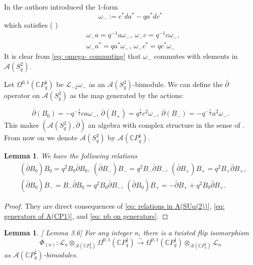 \documentclass[12pt]{article}
\newtheorem{lemma}[definition]{Lemma}
\numberwithin{equation}{section}
\def\pb{\bar{\partial}}
\def\C{{\mathbb C}}
\def\A{\mathcal{A}}
\def\L{\mathcal{L}}
\begin{document}
In \cite[Equation (3.18)]{khalkhali2011holomorphic} the authors introduced the $1$-form
$$
\omega_-:=c^* da^*-qa^*dc^*
$$
which satisfies ( \cite[Equation (3.21)]{khalkhali2011holomorphic})
\begin{equation}\label{eq: omega- commuting}
\begin{split}
&\omega_-a=q^{-1}a\omega_-,~\omega_-c=q^{-1}c\omega_-,\\
&\omega_-a^*=qa^*\omega_-,~ \omega_-c^*=qc^*\omega_-
\end{split}
\end{equation}
It is clear from \eqref{eq: omega- commuting} that $\omega_-$ commutes with elements in $\A(S_q^2)$.

Let $\Omega^{0,1}(\C P^1_q)$ be $\L_{-2}\omega_-$ as an $\A(S_q^2)$-bimodule. We can define the $\pb$ operator on $\A(S_q^2)$ as the map generated by the actions:

\begin{equation}\label{eq: pb on generators}
    \overline{\partial}(B_0)=-q^{-\frac{1}{2}}ca\omega_-,~\overline{\partial}(B_+)=q^{\frac{1}{2}}c^2\omega_-,~\overline{\partial}(B_-)=-q^{-\frac{1}{2}}a^2\omega_-.
\end{equation}
This makes $(\A(S_q^2), \overline{\partial})$ an algebra with complex structure in the sense of \cite[Definition 2.1]{khalkhali2011holomorphic}. From now on we denote $\A(S_q^2)$ by $\A(\C P^1_q)$.

\begin{lemma}\label{lemma: B0 pb B-  B+commutes}
    We have the following relations
    \begin{equation}\label{eq: B0 pb B- B+ commutes}
    \begin{split}
        &(\pb B_0 )B_0=q^2 B_0 \pb B_0, ~ (\pb B_- )B_-=q^2 B_- \pb B_-, ~(\pb B_+ )B_+=q^2 B_+ \pb B_+,\\
        & (\pb B_0 )B_-=B_-\pb B_0=q^2 B_0 \pb B_-,~(\pb B_0) B_+ = -\pb B_+ + q^2 B_0 \pb B_+.
        \end{split}
    \end{equation}
\end{lemma}
\begin{proof} They are direct consequences of \eqref{eq: relations in A(SUq(2))}, \eqref{eq: generators of A(CP1)}, and \eqref{eq: pb on generators}.
\end{proof}

\begin{lemma}\label{lemma: twist flip map}[\cite{khalkhali2011holomorphic} Lemma 3.6]
For any integer n, there is a twisted flip isomorphism
\begin{equation}\label{eq: twist flip isomorphism}
\Phi_{(n)}: \L_n\otimes_{\A(\C P^1_q)} \Omega^{0,1}(\C P^1_q)\overset{\sim}{\to}\Omega^{0,1}(\C P^1_q) \otimes_{\A(\C P^1_q)} \L_n
\end{equation}
as $\A(\C P^1_q)$-bimodules.
\end{lemma}
\end{document}
